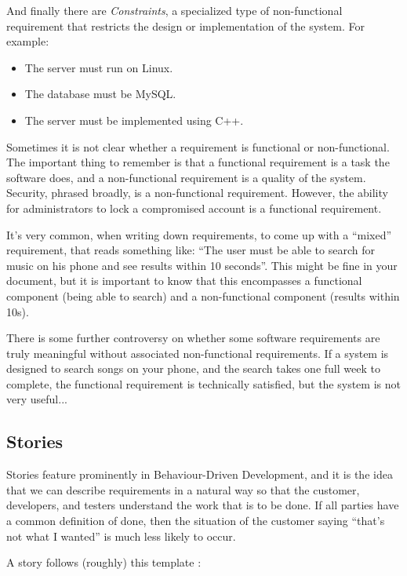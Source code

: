 And finally there are \textit{Constraints}, a specialized type of non-functional requirement that restricts the design or implementation of the system. For example:

\begin{itemize}
	\item The server must run on Linux.
	\item The database must be MySQL.
	\item The server must be implemented using C++.
\end{itemize}

Sometimes it is not clear whether a requirement is functional or non-functional. The important thing to remember is that a functional requirement is a task the software does, and a non-functional requirement is a quality of the system. Security, phrased broadly, is a non-functional requirement. However, the ability for administrators to lock a compromised account is a functional requirement. 

It's very common, when writing down requirements, to come up with a ``mixed'' requirement, that reads something like: ``The user must be able to search for music on his phone and see results within 10 seconds''. This might be fine in your document, but it is important to know that this encompasses a functional component (being able to search) and a non-functional component (results within 10s).

There is some further controversy on whether some software requirements are truly meaningful without associated non-functional requirements. If a system is designed to search songs on your phone, and the search takes one full week to complete, the functional requirement is technically satisfied, but the system is not very useful...

\subsection*{Stories}
Stories feature prominently in Behaviour-Driven Development, and it is the idea that we can describe requirements in a natural way so that the customer, developers, and testers understand the work that is to be done. If all parties have a common definition of done, then the situation of the customer saying ``that's not what I wanted'' is much less likely to occur. 

A story follows (roughly) this template \cite{bdd2}:

